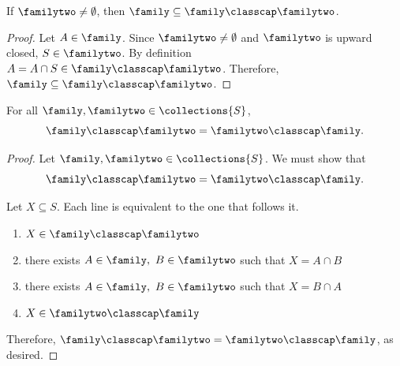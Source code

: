 \begin{theorem}
    \label{thm_classcap_contains_union}
     If $\familytwo \neq \emptyset$, then $\family \subseteq \family \classcap \familytwo$.
\end{theorem}

\begin{proof}
    

     Let $A \in \family$.  Since $\familytwo \neq \emptyset$ and $\familytwo$ is upward closed, $S \in \familytwo$.  By definition $A = A \cap S \in \family \classcap \familytwo$.  Therefore, $\family \subseteq \family \classcap \familytwo$.
\end{proof}


\begin{theorem}
    \label{thm_classcap_commutative}
    \leanok{}
    For all $\family, \familytwo \in \collections{S}$,
    \[\family \classcap \familytwo = \familytwo \classcap \family.\]
\end{theorem}

\begin{proof}
    Let $\family, \familytwo \in \collections{S}$.  We must show that
    \[\family \classcap \familytwo = \familytwo \classcap \family.\]
    
    Let $X \subseteq S$. Each line is equivalent to the one that follows it.
    \begin{enumerate}
        \item $X \in \family \classcap \familytwo$
        \item there exists $A \in \family, \ B \in \familytwo$ such that $X = A \cap B$
        \item there exists $A \in \family, \ B \in \familytwo$ such that $X = B \cap A$
        \item $X \in \familytwo \classcap \family$
    \end{enumerate}
    Therefore, $\family \classcap \familytwo = \familytwo \classcap \family$, as desired.
\end{proof}

